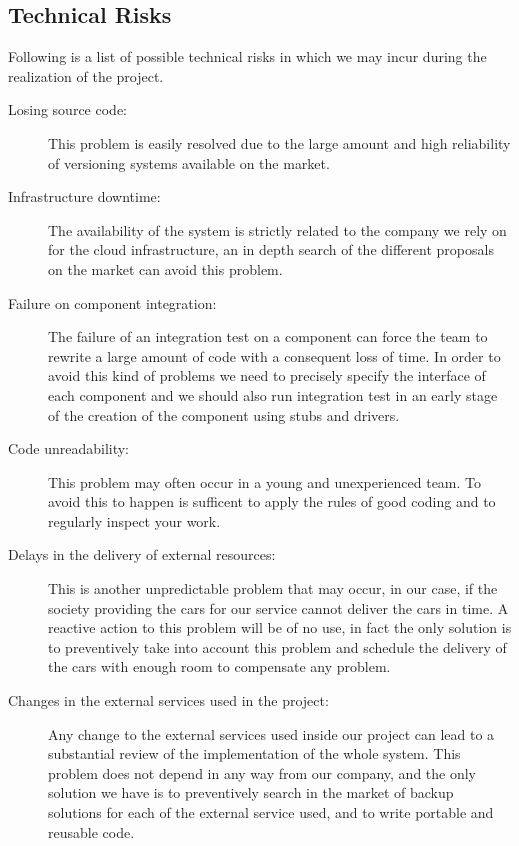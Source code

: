\subsection{Technical Risks}

Following is a list of possible technical risks in which we may incur during the
realization of the project.

\begin{description}
	\item [Losing source code: ] This problem is easily resolved due to the large
    amount and high reliability of versioning systems available on the market.
  \item [Infrastructure downtime: ] The availability of the system is strictly
    related to the company we rely on for the cloud infrastructure, an in depth
    search of the different proposals on the market can avoid this problem.
  \item [Failure on component integration: ] The failure of an integration test
    on a component can force the team to rewrite a large amount of code with a
    consequent loss of time. In order to avoid this kind of problems we need to
    precisely specify the interface of each component and we should also run
    integration test in an early stage of the creation of the component using
    stubs and drivers.
  \item [Code unreadability: ] This problem may often occur in a young and
    unexperienced team. To avoid this to happen is sufficent to apply the rules
    of good coding and to regularly inspect your work.
  \item [Delays in the delivery of external resources: ] This is another
    unpredictable problem that may occur, in our case, if the society providing
    the cars for our service cannot deliver the cars in time. A reactive action
    to this problem will be of no use, in fact the only solution is to
    preventively take into account this problem and schedule the delivery of the
    cars with enough room to compensate any problem.
  \item [Changes in the external services used in the project: ] Any change to
    the external services used inside our project can lead to a substantial
    review of the implementation of the whole system. This problem does not
    depend in any way from our company, and the only solution we have is to
    preventively search in the market of backup solutions for each of the
    external service used, and to write portable and reusable code.
\end{description}
